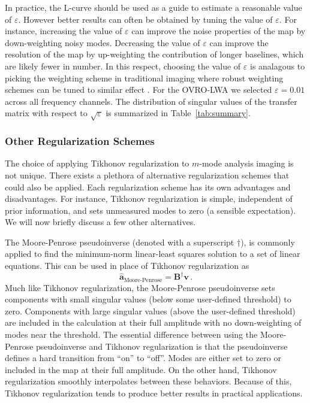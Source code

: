 \documentclass[twocolumn]{aastex61}
\renewcommand{\b}{\pmb}
\begin{document}
In practice, the L-curve should be used as a guide to estimate a reasonable value of $\varepsilon$.
However better results can often be obtained by tuning the value of $\varepsilon$. For instance,
increasing the value of $\varepsilon$ can improve the noise properties of the map by down-weighting
noisy modes. Decreasing the value of $\varepsilon$ can improve the resolution of the map by
up-weighting the contribution of longer baselines, which are likely fewer in number. In this
respect, choosing the value of $\varepsilon$ is analagous to picking the weighting scheme in
traditional imaging where robust weighting schemes can be tuned to similar effect \citep{briggs}.
For the OVRO-LWA we selected $\varepsilon = 0.01$ across all frequency channels. The distribution of
singular values of the transfer matrix with respect to $\sqrt{\varepsilon}$ is summarized in
Table~\ref{tab:summary}.

\subsubsection{Other Regularization Schemes}

The choice of applying Tikhonov regularization to $m$-mode analysis imaging is not unique. There
exists a plethora of alternative regularization schemes that could also be applied. Each
regularization scheme has its own advantages and disadvantages. For instance, Tikhonov
regularization is simple, independent of prior information, and sets unmeasured modes to zero (a
sensible expectation). We will now briefly discuss a few other alternatives.

The Moore-Penrose pseudoinverse (denoted with a superscript $\dagger$), is commonly applied to find
the minimum-norm linear-least squares solution to a set of linear equations. This can be used in
place of Tikhonov regularization as
\begin{equation}
    \b{\hat a}_\text{Moore-Penrose} = \b B^\dagger\b v\,.
\end{equation}
Much like Tikhonov regularization, the Moore-Penrose pseudoinverse sets components with small
singular values (below some user-defined threshold) to zero. Components with large singular values
(above the user-defined threshold) are included in the calculation at their full amplitude with no
down-weighting of modes near the threshold. The essential difference between using the Moore-Penrose
pseudoinverse and Tikhonov regularization is that the pseudoinverse defines a hard transition from
``on'' to ``off''. Modes are either set to zero or included in the map at their full amplitude. On
the other hand, Tikhonov regularization smoothly interpolates between these behaviors. Because of
this, Tikhonov regularization tends to produce better results in practical applications.
\end{document}
